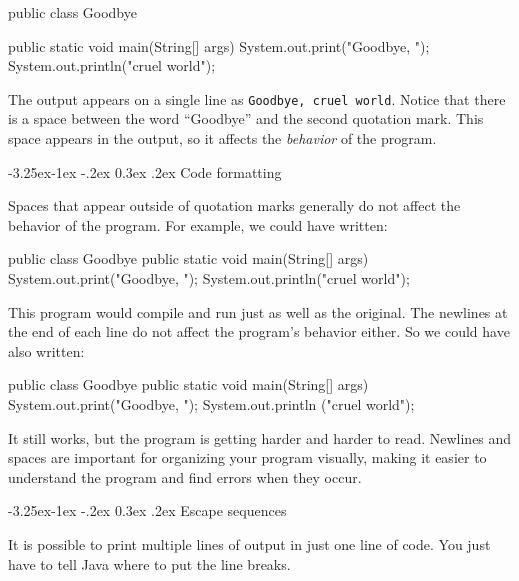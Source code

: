 \documentclass[12pt]{book}
\makeatletter
\theoremstyle{exercise}
\renewcommand\subsection{\@startsection{subsection}{2}{\z@}%
    {-3.25ex\@plus -1ex \@minus -.2ex}%
    {0.3ex \@plus .2ex}%
    {\normalfont\large\bfseries}}
\makeatother
\begin{document}
\begin{code}
public class Goodbye {

    public static void main(String[] args) {
        System.out.print("Goodbye, ");
        System.out.println("cruel world");
    }

}
\end{code}

The output appears on a single line as {\tt Goodbye, cruel world}.
Notice that there is a space between the word ``Goodbye'' and the second quotation mark.
This space appears in the output, so it affects the {\em behavior} of the program.

\subsection{Code formatting}
\label{sec:formatting}

Spaces that appear outside of quotation marks generally do not affect the behavior of the program.
For example, we could have written:

\begin{code}
public class Goodbye {
public static void main(String[] args) {
System.out.print("Goodbye, ");
System.out.println("cruel world");
}
}
\end{code}

This program would compile and run just as well as the original.
The newlines at the end of each line do not affect the program's behavior either.
So we could have also written:

\begin{code}
public class Goodbye { public static void main(String[] args) {
System.out.print("Goodbye, "); System.out.println
("cruel world");}}
\end{code}

It still works, but the program is getting harder and harder to read.
Newlines and spaces are important for organizing your program visually, making it easier to understand the program and find errors when they occur.

\subsection{Escape sequences}

It is possible to print multiple lines of output in just one line of code.
You just have to tell Java where to put the line breaks.
\end{document}
